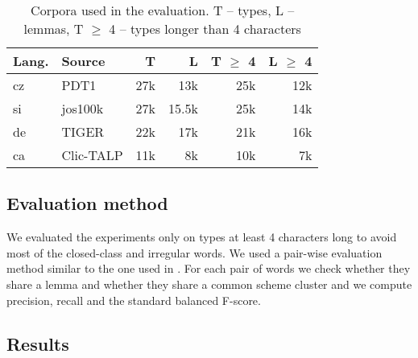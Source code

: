 \documentclass[11pt]{article}
\begin{document}
\begin{table}[h]
\begin{small}
\begin{center}
\begin{tabular}{|l|l|r|r|r|r|}
\hline
\bf Lang. &\bf Source & \bf T & \bf L & \bf T $\geq$ 4 & \bf L $\geq$ 4\\\hline
cz & PDT1\footnotemark[2] & 27k & 13k & 25k & 12k\\\hline
si & jos100k\footnotemark[3] & 27k & 15.5k & 25k & 14k\\\hline
de & TIGER\footnotemark[4] & 22k & 17k & 21k & 16k\\\hline 
ca & Clic-TALP & 11k & 8k & 10k & 7k\\
\hline
\end{tabular}
\end{center}
\end{small}
\caption{\label{table:corpora} Corpora used in the evaluation. T -- types, L -- lemmas,  T $\geq$ 4 -- types longer than 4 characters}
\end{table}
  


\subsection{Evaluation method}

\noindent
We evaluated the experiments only on types at least 4 characters long to avoid most of the closed-class and irregular words. %
We used a pair-wise evaluation method similar to the one used in \cite{snover-jarosz-2002}. For each pair of words we check whether they share a lemma and whether they share a common scheme cluster and we compute precision, recall and the standard balanced F-score.

\subsection{Results}
\end{document}
